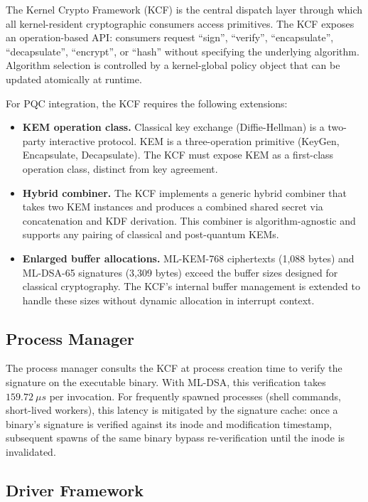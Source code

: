 \documentclass[11pt, a4paper]{article}
\begin{document}
The Kernel Crypto Framework (KCF) is the central dispatch layer through which all kernel-resident cryptographic consumers access primitives. The KCF exposes an operation-based API: consumers request ``sign'', ``verify'', ``encapsulate'', ``decapsulate'', ``encrypt'', or ``hash'' without specifying the underlying algorithm. Algorithm selection is controlled by a kernel-global policy object that can be updated atomically at runtime.

For PQC integration, the KCF requires the following extensions:

\begin{itemize}
    \item \textbf{KEM operation class.} Classical key exchange (Diffie-Hellman) is a two-party interactive protocol. KEM is a three-operation primitive (KeyGen, Encapsulate, Decapsulate). The KCF must expose KEM as a first-class operation class, distinct from key agreement.
    \item \textbf{Hybrid combiner.} The KCF implements a generic hybrid combiner that takes two KEM instances and produces a combined shared secret via concatenation and KDF derivation. This combiner is algorithm-agnostic and supports any pairing of classical and post-quantum KEMs.
    \item \textbf{Enlarged buffer allocations.} ML-KEM-768 ciphertexts (1,088 bytes) and ML-DSA-65 signatures (3,309 bytes) exceed the buffer sizes designed for classical cryptography. The KCF's internal buffer management is extended to handle these sizes without dynamic allocation in interrupt context.
\end{itemize}

\subsection{Process Manager}\label{sec:pm-integration}

The process manager consults the KCF at process creation time to verify the signature on the executable binary. With ML-DSA, this verification takes $159.72~\mu s$ per invocation. For frequently spawned processes (shell commands, short-lived workers), this latency is mitigated by the signature cache: once a binary's signature is verified against its inode and modification timestamp, subsequent spawns of the same binary bypass re-verification until the inode is invalidated.

\subsection{Driver Framework}\label{sec:driver-integration}
\end{document}
